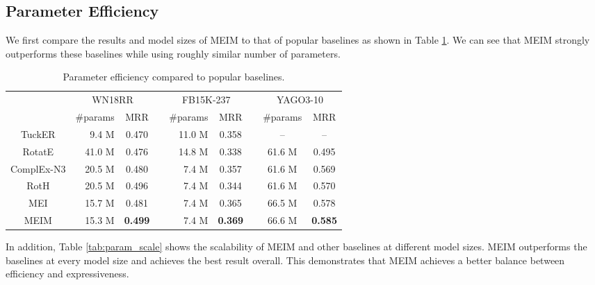 \documentclass{article}
\theoremstyle{plain}
\theoremstyle{remark}
\begin{document}
\subsection{Parameter Efficiency}
We first compare the results and model sizes of MEIM to that of popular baselines as shown in Table \ref{tab:param_efficiency}. We can see that MEIM strongly outperforms these baselines while using roughly similar number of parameters. 

\begin{table}[t]
	\centering  
	\begin{adjustbox}{max width=\linewidth}
		\begin{tabular}{@{\extracolsep{-8pt}}crclrclcc}


			& \multicolumn{2}{c}{WN18RR} && \multicolumn{2}{c}{FB15K-237} && \multicolumn{2}{c}{YAGO3-10} \\
			\cmidrule{2-3} \cmidrule{5-6} \cmidrule{8-9}
			& \#params & MRR && \#params & MRR && \#params & MRR \\
\cmidrule{1-3} \cmidrule{5-6} \cmidrule{8-9}
			
			TuckER & 9.4 M & 0.470 && 11.0 M & 0.358 && -- & -- \\
			RotatE & 41.0 M & 0.476 && 14.8 M & 0.338 && 61.6 M & 0.495 \\
			ComplEx-N3 & 20.5 M & 0.480 && 7.4 M & 0.357 && 61.6 M & 0.569 \\
			RotH & 20.5 M & 0.496 && 7.4 M & 0.344 && 61.6 M & 0.570 \\
			


MEI & 15.7 M & 0.481 && 7.4 M & 0.365 && 66.5 M & 0.578 \\
			
			\midrule
			
			MEIM & 15.3 M & \textbf{0.499} && 7.4 M & \textbf{0.369} && 66.6 M & \textbf{0.585} \\
			
\end{tabular}
	\end{adjustbox}
	\caption[]{Parameter efficiency compared to popular baselines.}
	\label{tab:param_efficiency}
\end{table}

In addition, Table \ref{tab:param_scale} shows the scalability of MEIM and other baselines at different model sizes. MEIM outperforms the baselines at every model size and achieves the best result overall. This demonstrates that MEIM achieves a better balance between efficiency and expressiveness.
\end{document}
